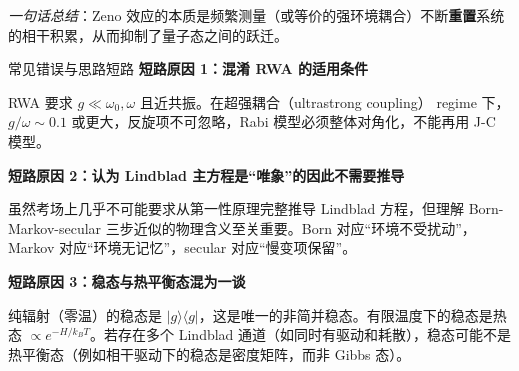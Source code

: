\textit{一句话总结}：Zeno 效应的本质是频繁测量（或等价的强环境耦合）不断\textbf{重置}系统的相干积累，从而抑制了量子态之间的跃迁。

\begin{errorbox}[colback=white]{常见错误与思路短路}
\textbf{短路原因 1：混淆 RWA 的适用条件}

RWA 要求 $g \ll \omega_0, \omega$ 且近共振。在超强耦合（ultrastrong coupling） regime 下，$g/\omega \sim 0.1$ 或更大，反旋项不可忽略，Rabi 模型必须整体对角化，不能再用 J-C 模型。

\textbf{短路原因 2：认为 Lindblad 主方程是``唯象''的因此不需要推导}

虽然考场上几乎不可能要求从第一性原理完整推导 Lindblad 方程，但理解 Born-Markov-secular 三步近似的物理含义至关重要。Born 对应``环境不受扰动''，Markov 对应``环境无记忆''，secular 对应``慢变项保留''。

\textbf{短路原因 3：稳态与热平衡态混为一谈}

纯辐射（零温）的稳态是 $|g\rangle\langle g|$，这是唯一的非简并稳态。有限温度下的稳态是热态 $\propto e^{-H/k_B T}$。若存在多个 Lindblad 通道（如同时有驱动和耗散），稳态可能不是热平衡态（例如相干驱动下的稳态是密度矩阵，而非 Gibbs 态）。
\end{errorbox}

